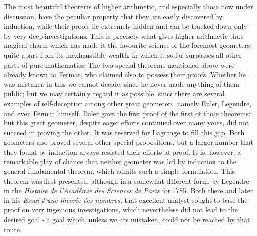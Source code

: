 \documentclass[12pt]{article}
\begin{document}
The most beautiful theorems of higher arithmetic, and especially those now under discussion, have the peculiar property that they are easily discovered by induction, while their proofs lie extremely hidden and can be tracked down only by very deep investigations. This is precisely what gives higher arithmetic that magical charm which has made it the favourite science of the foremost geometers, quite apart from its inexhaustible wealth, in which it so far surpasses all other parts of pure mathematics. The two special theorems mentioned above were already known to Fermat, who claimed also to possess their proofs. Whether he was mistaken in this we cannot decide, since he never made anything of them public; but we may certainly regard it as possible, since there are several examples of self-deception among other great geometers, namely Euler, Legendre, and even Fermat himself. Euler gave the first proof of the first of those theorems; but this great geometer, despite eager efforts continued over many years, did not succeed in proving the other. It was reserved for Lagrange to fill this gap. Both geometers also proved several other special propositions, but a larger number that they found by induction always resisted their efforts at proof. It is, however, a remarkable play of chance that neither geometer was led by induction to the general fundamental theorem, which admits such a simple formulation. This theorem was first presented, although in a somewhat different form, by Legendre in the \textit{Histoire de l'Académie des Sciences de Paris} for 1785. Both there and later in his \textit{Essai d'une théorie des nombres}, that excellent analyst sought to base the proof on very ingenious investigations, which nevertheless did not lead to the desired goal - a goal which, unless we are mistaken, could not be reached by that route.
\end{document}
